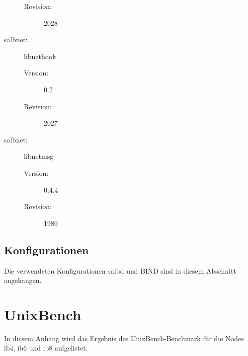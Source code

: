 \documentclass[a4paper, 12pt, BCOR10mm, DIV12, toc=bibliography, toc=listof, german]{scrbook}
\begin{document}
\begin{description}
\begin{description}
					\item[Revision:] 2028
				\end{description}
			\item[salbnet:] libnethook
				\begin{description}
					\item[Version:] 0.2
					\item[Revision:] 2027
				\end{description}
			\item[salbnet:] libnetmsg
				\begin{description}
					\item[Version:] 0.4.4
					\item[Revision:] 1980
				\end{description}
		\end{description}


		\section{Konfigurationen} %
		\label{sec:konfigurationen}

			Die verwendeten Konfigurationen salbd und BIND sind in diesem Abschnitt angehangen.

			

		

		

		



	\chapter{UnixBench} %
	\label{cha:unixbench}

			In diesem Anhang wird das Ergebnis des UnixBench-Benchmark für die Nodes ib4, ib6 und
			ib8 aufgelistet.

	
	
	
\end{document}
